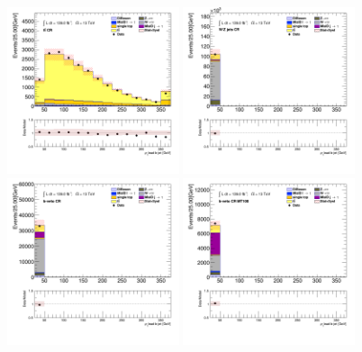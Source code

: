 		\begin{figure}[!htp]
			\begin{center}    
			\includegraphics[width=0.45\textwidth]{chapters/chapter6_HPlus/images/taujets/bjet_0_pt_TTBAR.png}
			\includegraphics[width=0.45\textwidth]{chapters/chapter6_HPlus/images/taujets/bjet_0_pt_WJETS.png} \\
			\includegraphics[width=0.45\textwidth]{chapters/chapter6_HPlus/images/taujets/bjet_0_pt_BVETO.png}
			\includegraphics[width=0.45\textwidth]{chapters/chapter6_HPlus/images/taujets/bjet_0_pt_BVETO_MT100.png} \\

\end{center}
\end{figure}
